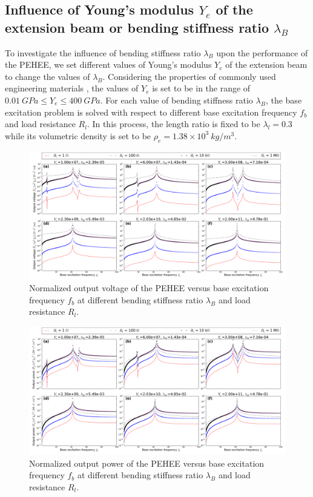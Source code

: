 \documentclass{elsarticle}
\begin{document}
\subsection{Influence of Young's modulus $Y_e$ of the extension beam or bending stiffness ratio $\lambda_B$}

To investigate the influence of bending stiffness ratio $\lambda_B$ upon the performance of the PEHEE, we set different values of Young's modulus $Y_e$ of the extension beam to change the values of $\lambda_B$. Considering the properties of commonly used engineering materials \cite{warlimont2018springer}, the values of $Y_e$ is set to be in the range of $0.01\ GPa \leq Y_e \leq 400\ GPa$. For each value of bending stiffness ratio $\lambda_B$, the base excitation problem is solved with respect to different base excitation frequency $f_b$ and load resistance $R_l$. In this process, the length ratio is fixed to be $\lambda_l = 0.3$ while its volumetric density is set to be $\rho_e = 1.38 \times 10^3\ kg/m^3$.


\begin{figure}[!htbp]
    \centering
    \includegraphics[width=\textwidth]{./fig_output_voltage_vs_fr_Rl_lamB_all}
    \caption{ Normalized output voltage of the PEHEE versus base excitation frequency $f_b$ at different bending stiffness ratio $\lambda_B$ and load resistance $R_l$. }
    \label{fig:fig_output_voltage_vs_fr_Rl_lamB_all}
\end{figure}

\begin{figure}[!htbp]
    \centering
    \includegraphics[width=\textwidth]{./fig_output_power_vs_fr_Rl_lamB_all}
    \caption{Normalized output power of the PEHEE versus base excitation frequency $f_b$ at different bending stiffness ratio $\lambda_B$ and load resistance $R_l$.  }
    \label{fig:fig_output_power_vs_fr_Rl_lamB_all}
\end{figure}
\end{document}
